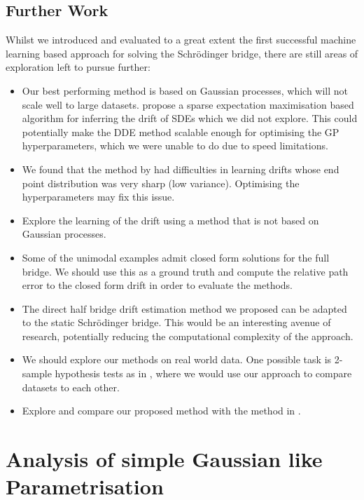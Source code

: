 \documentclass[a4paper,12pt,twoside,openright]{report}
\theoremstyle{definition}
\begin{document}
\section{Further Work}

Whilst we introduced and evaluated to a great extent the first successful machine learning based approach for solving the Schrödinger bridge, there are still areas of exploration left to pursue further:

\begin{itemize}
    \item Our best performing method is based on Gaussian processes, which will not scale well to large datasets. \cite{ruttor2013approximate} propose a sparse expectation maximisation based algorithm for inferring the drift of SDEs which we did not explore. This could potentially make the DDE method scalable enough for optimising the GP hyperparameters, which we were unable to do due to speed limitations.
    \item We found that the method by \cite{ruttor2013approximate} had difficulties in learning drifts whose end point distribution was very sharp (low variance). Optimising the hyperparameters may fix this issue.  
    \item Explore the learning of the drift using a method that is not based on Gaussian processes.
    \item Some of the unimodal examples admit closed form solutions for the full bridge. We should use this as a ground truth and compute the relative path error to the closed form drift in order to evaluate the methods.
    \item The direct half bridge drift estimation method we proposed can be adapted to the static Schrödinger bridge. This would be an interesting avenue of research, potentially reducing the computational complexity of the approach.
    \item We should explore our methods on real world data. One possible task is 2-sample hypothesis tests as in \cite{gretton2012kernel}, where we would use our approach to compare datasets to each other. 
    \item Explore and compare our proposed method with the method in \cite{bernton2019schr}.
\end{itemize}

\appendix


\singlespacing

\chapter{Analysis of simple Gaussian like Parametrisation}\label{app:bad_gauss}
\end{document}
